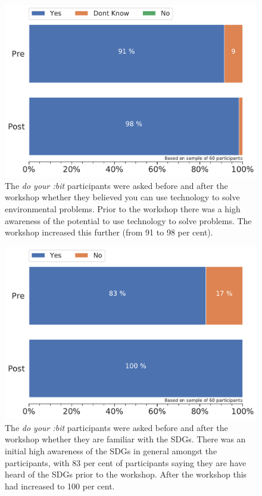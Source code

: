 \documentclass[12pt]{report} %
\newcommand{\DYB}{\textit{do your :bit }}
\begin{document}
\begin{figure}[t!]
    \centering
        \includegraphics[width=1\textwidth]{bar_techsolve}
\caption{The \DYB participants were asked before and after the workshop whether they believed you can use technology to solve environmental problems. Prior to the workshop there was a high awareness of the potential to use technology to solve problems. The workshop increased this further (from 91 to 98 per cent).} 
\label{fig:techsolve}
\end{figure}

\begin{figure}[t!]
    \centering
        \includegraphics[width=1\textwidth]{bar_knowsdgs}
\caption{The \DYB participants were asked before and after the workshop whether they are familiar with the SDGs. There was an initial high awareness of the SDGs in general amongst the participants, with 83 per cent of participants saying they are have heard of the SDGs prior to the workshop. After the workshop this had increased to 100 per cent. } 
\label{fig:knowsdgs}
\end{figure}
\end{document}
